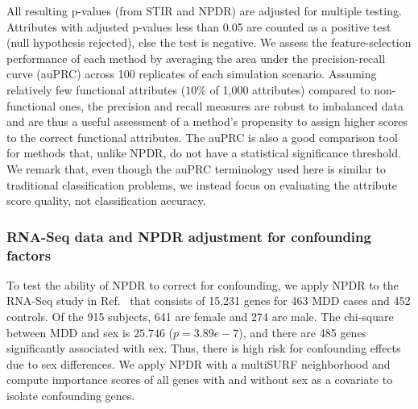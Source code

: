\documentclass{bioinfo}
\begin{document}
All resulting p-values (from STIR and NPDR) are adjusted for multiple testing.
Attributes with adjusted p-values less than 0.05 are counted as a positive test (null hypothesis rejected), else the test is negative.
We assess the feature-selection performance of each method by averaging the area under the precision-recall curve (auPRC) across 100 replicates of each simulation scenario.
Assuming relatively few functional attributes ($10\%$ of 1,000 attributes) compared to non-functional ones, the precision and recall measures are robust to imbalanced data and are thus a useful assessment of a method's propensity to assign higher scores to the correct functional attributes.
The auPRC is also a good comparison tool for methods that, unlike NPDR, do not have a statistical significance threshold.
We remark that, even though the auPRC terminology used here is similar to traditional classification problems, we instead focus on evaluating the attribute score quality, not classification accuracy.

\subsubsection{RNA-Seq data and NPDR adjustment for confounding factors}
To test the ability of NPDR to correct for confounding, we apply NPDR to the RNA-Seq study in Ref.~\cite{mostafavi14} that consists of 15,231 genes for 463 MDD cases and 452 controls.
Of the 915 subjects, 641 are female and 274 are male.
The chi-square between MDD and sex is $25.746$ ($p=3.89e-7$), and there are 485 genes significantly associated with sex.
Thus, there is high risk for confounding effects due to sex differences.
We apply NPDR with a multiSURF neighborhood and compute importance scores of all genes with and without sex as a covariate to isolate confounding genes.
\end{document}
